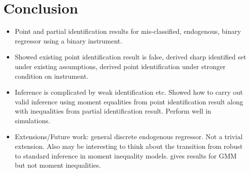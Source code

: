 \section{Conclusion}

\begin{itemize}
  \item Point and partial identification results for mis-classified, endogenous, binary regressor using a binary instrument.
  \item Showed existing point identification result is false, derived sharp identified set under existing assumptions, derived point identification under stronger condition on instrument.
  \item Inference is complicated by weak identification etc.
    Showed how to carry out valid inference using moment equalities from point identification result along with inequalities from partial identification result.
    Perform well in simulations.
  \item Extensions/Future work: general discrete endogenous regressor. Not a trivial extension. Also may be interesting to think about the transition from robust to standard inference in moment inequality models.
    \cite{andrews2016valid} gives results for GMM but not moment inequalities.
\end{itemize}

